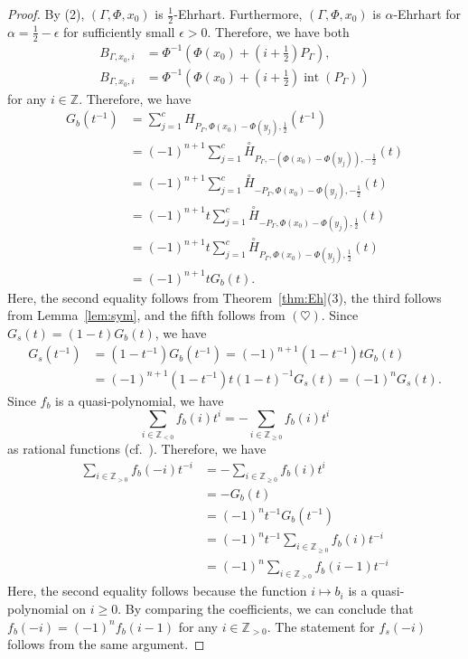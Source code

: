 \documentclass[ALCO,published]{cedram}
\theoremstyle{remark}
\begin{document}
\begin{proof}
By (2), $(\Gamma, \Phi, x_0)$ is $\frac{1}{2}$-Ehrhart. 
Furthermore, $(\Gamma, \Phi, x_0)$ is $\alpha$-Ehrhart for $\alpha = \frac{1}{2} - \epsilon$ for sufficiently small $\epsilon > 0$. 
Therefore, we have both
\begin{align*}
B_{\Gamma, x_0, i} 
&= \Phi^{-1} \left( \Phi(x_0) + \left( i + \frac{1}{2} \right) P_{\Gamma} \right), \\
B_{\Gamma, x_0, i}
&= \Phi^{-1} \left( \Phi(x_0) + \left( i + \frac{1}{2} \right) \operatorname{int}(P_{\Gamma}) \right) 
\end{align*}
for any $i \in \mathbb{Z}$. 
Therefore, we have 
\begin{align*}
G_b(t^{-1}) 
&= \sum _{j = 1} ^c H_{P_{\Gamma}, \Phi(x_0) - \Phi(y_j), \frac{1}{2}}(t^{-1}) \\
&= (-1)^{n+1} \sum _{j = 1} ^c \overset{\circ}{H}_{P_{\Gamma}, - (\Phi(x_0) - \Phi(y_j)), - \frac{1}{2}}(t)\\
&= (-1)^{n+1} \sum _{j = 1} ^c \overset{\circ}{H}_{-P_{\Gamma}, \Phi(x_0) - \Phi(y_j), - \frac{1}{2}}(t)\\
&= (-1)^{n+1} t \sum _{j = 1} ^c \overset{\circ}{H}_{-P_{\Gamma}, \Phi(x_0) - \Phi(y_j), \frac{1}{2}}(t)\\
&= (-1)^{n+1} t \sum _{j = 1} ^c \overset{\circ}{H}_{P_{\Gamma}, \Phi(x_0) - \Phi(y_j), \frac{1}{2}}(t)\\
&= (-1)^{n+1} t G_b(t). 
\end{align*}
Here, the second equality follows from Theorem~\ref{thm:Eh}(3), the third follows from Lemma~\ref{lem:sym}, 
and the fifth follows from $(\heartsuit)$. 
Since $G_s(t) = (1-t)G_b(t)$, we have 
\begin{align*}
G_s(t^{-1}) 
&= (1-t^{-1})G_b(t^{-1}) = (-1)^{n+1}(1-t^{-1})tG_b(t) \\
&= (-1)^{n+1}(1-t^{-1})t(1-t)^{-1}G_s(t) = (-1)^nG_s(t). 
\end{align*}
Since $f_b$ is a quasi-polynomial, we have 
\[
\sum_{i \in \mathbb{Z}_{< 0}} f_b(i) t^i 
= - \sum_{i \in \mathbb{Z}_{\ge 0}} f_b(i) t^i
\]
as rational functions (cf.~\cite[Exercise 4.7]{BR}). 
Therefore, we have 
\begin{align*}
\sum_{i \in \mathbb{Z}_{> 0}} f_b(-i) t^{-i}
&= - \sum_{i \in \mathbb{Z}_{\ge 0}} f_b(i) t^i \\
&= - G_b(t) \\
&= (-1)^{n}t^{-1}G_b(t^{-1})\\
&= (-1)^{n}t^{-1}\sum_{i \in \mathbb{Z}_{\ge 0}} f_b(i) t^{-i}\\
&= (-1)^{n}\sum_{i \in \mathbb{Z}_{> 0}} f_b(i-1) t^{-i}
\end{align*}
Here, the second equality follows because the function $i \mapsto b_i$ is a quasi-polynomial on $i \ge 0$. 
By comparing the coefficients, we can conclude that $f_b(-i) = (-1)^n f_b(i-1)$ for any $i \in \mathbb{Z}_{> 0}$. 
The statement for $f_s(-i)$ follows from the same argument. 
\end{proof}
\end{document}
